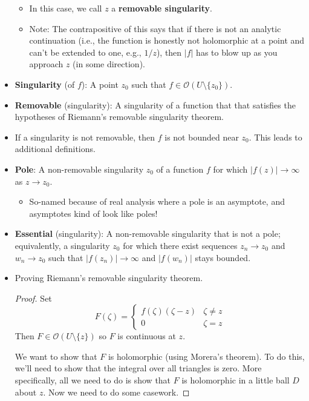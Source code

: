 \documentclass[../notes.tex]{subfiles}
\begin{document}
\begin{itemize}
    \begin{itemize}
        \item In this case, we call $z$ a \textbf{removable singularity}.
        \item Note: The contrapositive of this says that if there is not an analytic continuation (i.e., the function is honestly not holomorphic at a point and can't be extended to one, e.g., $1/z$), then $|f|$ has to blow up as you approach $z$ (in some direction).
    \end{itemize}
    \item \textbf{Singularity} (of $f$): A point $z_0$ such that $f\in\mathcal{O}(U\setminus\{z_0\})$.
    \item \textbf{Removable} (singularity): A singularity of a function that that satisfies the hypotheses of Riemann's removable singularity theorem.
    \item If a singularity is not removable, then $f$ is not bounded near $z_0$. This leads to additional definitions.
    \item \textbf{Pole}: A non-removable singularity $z_0$ of a function $f$ for which $|f(z)|\to\infty$ as $z\to z_0$.
    \begin{itemize}
        \item So-named because of real analysis where a pole is an asymptote, and asymptotes kind of look like poles!
    \end{itemize}
    \item \textbf{Essential} (singularity): A non-removable singularity that is not a pole; equivalently, a singularity $z_0$ for which there exist sequences $z_n\to z_0$ and $w_n\to z_0$ such that $|f(z_n)|\to\infty$ and $|f(w_n)|$ stays bounded.
    \item Proving Riemann's removable singularity theorem.
    \begin{proof}
        Set
        \begin{equation*}
            F(\zeta) =
            \begin{cases}
                f(\zeta)(\zeta-z) & \zeta\neq z\\
                0 & \zeta=z
            \end{cases}
        \end{equation*}
        Then $F\in\mathcal{O}(U\setminus\{z\})$ so $F$ is continuous at $z$.\par
        We want to show that $F$ is holomorphic (using Morera's theorem). To do this, we'll need to show that the integral over all triangles is zero. More specifically, all we need to do is show that $F$ is holomorphic in a little ball $D$ about $z$. Now we need to do some casework.\par

\end{proof}
\end{itemize}
\end{document}
